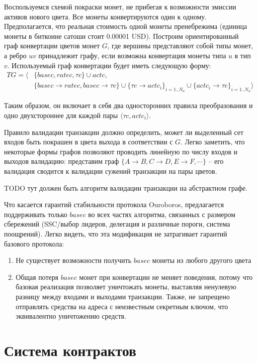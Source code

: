 \documentclass[specification,annotation]{itmo-student-thesis}
\begin{document}
Воспользуемся схемой покраски монет, не прибегая к возможности эмиссии
активов нового цвета. Все монеты конвертируются один к
одному. Предполагается, что реальная стоимость одной монеты
пренебрежима (единица монеты в биткоине сатоши стоит 0.00001
USD). Построим ориентированный граф конвертации цветов монет $G$, где
вершины представляют собой типы монет, а ребро $uv$ принадлежит графу,
если возможна конвертация монеты типа $u$ в тип $v$. Используемый граф
конвертации будет иметь следующую форму:
\begin{align*}
  TG = \langle &\{basec, ratec, \tau c\} \cup actc,\\
  &\{basec \rightarrow ratec
  , basec \rightarrow \tau c\} \cup
  \{\tau c \rightarrow actc_i\}_{i=1..N_a} \cup
  \{actc_i \rightarrow \tau c\}_{i=1..N_a}\rangle
\end{align*}

Таким образом, он включает в себя два односторонних правила
преобразования и одно двухстороннее для каждой пары $\langle \tau c,
actc_i\rangle$.

Правило валидации транзакции должно определить, может ли выделенный
сет входов быть покрашен в цвета выхода в соответствии с $G$. Легко
заметить, что некоторые формы графов позволяют проводить линейную по
числу входов и выходов валидацию: представим граф $\{A \rightarrow B,
C \rightarrow D, E \rightarrow F, \cdots\}$ -- его валидация сводится
к валидации сужений транзакции на пары цветов.

TODO тут должен быть алгоритм валидации транзакции на абстрактном графе.

Что касается гарантий стабильности протокола Ouroboros, предлагается
поддерживать только $basec$ во всех частях алгоритма, связанных с
размером сбережений (SSC/выбор лидеров, делегация и различные пороги,
система поощрений). Легко видеть, что эта модификация не затрагивает
гарантий базового протокола:
\begin{enumerate}
\item Не существует возможности получить $basec$ монеты из любого
  другого цвета
\item Общая потеря $basec$ монет при конвертации не меняет поведения,
  потому что базовая реализация позволяет уничтожать монеты, выставляя
  ненулевую разницу между входами и выходами транзакции. Также, не
  запрещено отправлять средства на адреса с неизвестным секретным
  ключом, что эквивалентно уничтожению средств.
\end{enumerate}

\section{Система контрактов}
\end{document}
